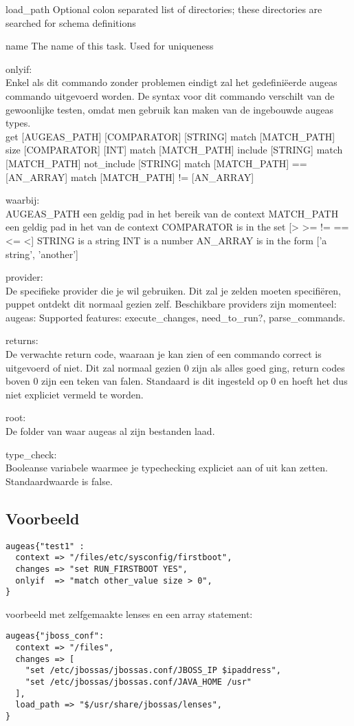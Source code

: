 load\_path
Optional colon separated list of directories; these directories are searched for schema definitions

name
The name of this task. Used for uniqueness

onlyif:\\
Enkel als dit commando zonder problemen eindigt zal het gedefini\"{e}erde augeas commando uitgevoerd worden. De syntax voor dit commando verschilt van de gewoonlijke testen, omdat men gebruik kan maken van de ingebouwde augeas types.\\
get [AUGEAS\_PATH] [COMPARATOR] [STRING]
match [MATCH\_PATH] size [COMPARATOR] [INT]
match [MATCH\_PATH] include [STRING]
match [MATCH\_PATH] not\_include [STRING]
match [MATCH\_PATH] == [AN\_ARRAY]
match [MATCH\_PATH] != [AN\_ARRAY]

waarbij:\\
AUGEAS\_PATH een geldig pad in het bereik van de context
MATCH\_PATH een geldig pad in het van de context
COMPARATOR is in the set [> >= != == <= <]
STRING is a string
INT is a number
AN\_ARRAY is in the form ['a string', 'another']

provider:\\
De specifieke provider die je wil gebruiken. Dit zal je zelden moeten specifi\"{e}ren, puppet ontdekt dit normaal gezien zelf. Beschikbare providers zijn momenteel:\\
augeas: Supported features: execute\_changes, need\_to\_run?, parse\_commands.

returns:\\
De verwachte return code, waaraan je kan zien of een commando correct is uitgevoerd of niet. Dit zal normaal gezien 0 zijn als alles goed ging, return codes boven 0 zijn een teken van falen. Standaard is dit ingesteld op 0 en hoeft het dus niet expliciet vermeld te worden.

root:\\
De folder van waar augeas al zijn bestanden laad.

type\_check:\\
Booleanse variabele waarmee je typechecking expliciet aan of uit kan zetten. Standaardwaarde is false.

\subsection{Voorbeeld}
\begin{lstlisting}
augeas{"test1" :
  context => "/files/etc/sysconfig/firstboot",
  changes => "set RUN_FIRSTBOOT YES",
  onlyif  => "match other_value size > 0",
}
\end{lstlisting}

voorbeeld met zelfgemaakte lenses en een array statement:
\begin{lstlisting}
augeas{"jboss_conf":
  context => "/files",
  changes => [
    "set /etc/jbossas/jbossas.conf/JBOSS_IP $ipaddress",
    "set /etc/jbossas/jbossas.conf/JAVA_HOME /usr"
  ],
  load_path => "$/usr/share/jbossas/lenses",
}
\end{lstlisting}
